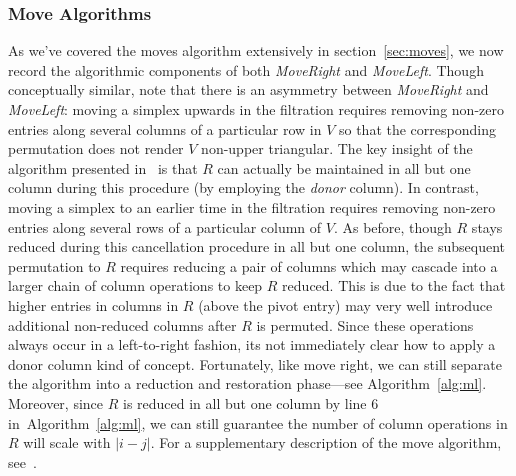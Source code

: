 \documentclass[sn-mathphys]{sn-jnl}
\begin{document}
\subsubsection*{Move Algorithms}
As we've covered the moves algorithm extensively in section~\ref{sec:moves}, we now record the algorithmic components of both \emph{MoveRight} and \emph{MoveLeft}.
Though conceptually similar, note that there is an asymmetry between \emph{MoveRight} and \emph{MoveLeft}: moving a simplex upwards in the filtration requires removing non-zero entries along several columns of a particular row in $V$ so that the corresponding permutation does not render $V$ non-upper triangular. The key insight of the algorithm presented in~\cite{busaryev2010tracking} is that $R$ can actually be maintained in all but one column during this procedure (by employing the \emph{donor} column). In contrast, moving a simplex to an earlier time in the filtration requires removing non-zero entries along several rows of a particular column of $V$. As before, though $R$ stays reduced during this cancellation procedure in all but one column, the subsequent permutation to $R$ requires reducing a pair of columns which may cascade into a larger chain of column operations to keep $R$ reduced. 
This is due to the fact that higher entries in columns in $R$ (above the pivot entry) may very well introduce additional non-reduced columns after $R$ is permuted. 
Since these operations always occur in a left-to-right fashion, its not immediately clear how to apply a donor column kind of concept. Fortunately, like move right, we can still separate the algorithm into a reduction and restoration phase---see Algorithm~\ref{alg:ml}. Moreover, since $R$ is reduced in all but one column by line 6 in~Algorithm~\ref{alg:ml}, we can still guarantee the number of column operations in $R$ will scale with $\lvert i - j \rvert$. For a supplementary description of the move algorithm, see~\cite{busaryev2010tracking}.
\end{document}
